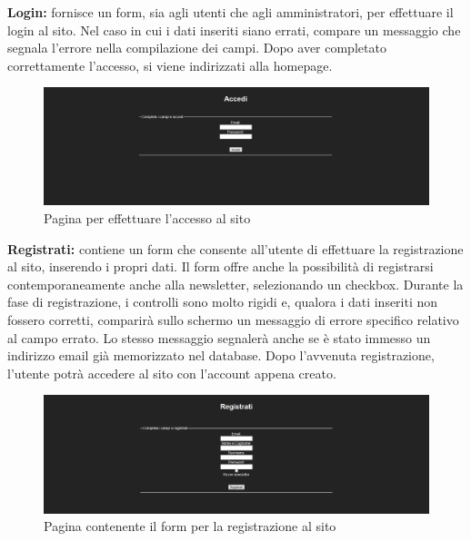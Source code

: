 \documentclass[10pt, a4paper]{article}
\begin{document}
\begin{flushleft} \textbf{Login: }fornisce un form, sia agli utenti che agli amministratori, per effettuare il login al sito. Nel caso in cui i dati inseriti siano errati, compare un messaggio che segnala l'errore nella compilazione dei campi. Dopo aver completato correttamente l'accesso, si viene indirizzati alla homepage. \end{flushleft}
\begin{figure}[h!]
 \centering
  \includegraphics[width=1\textwidth]{Images/login.png}
  \caption{Pagina per effettuare l'accesso al sito}
  \label{fig:login}
\end{figure}
\begin{flushleft} \textbf{Registrati: }contiene un form che consente all'utente di effettuare la registrazione al sito, inserendo i propri dati. Il form offre anche la possibilità di registrarsi contemporaneamente anche alla newsletter, selezionando un checkbox. Durante la fase di registrazione, i controlli sono molto rigidi e, qualora i dati inseriti non fossero corretti, comparirà sullo schermo un messaggio di errore specifico relativo al campo errato. Lo stesso messaggio segnalerà anche se è stato immesso un indirizzo email già memorizzato nel database. Dopo l'avvenuta registrazione, l'utente potrà accedere al sito con l'account appena creato. \end{flushleft}
\begin{figure}[h!]
 \centering
  \includegraphics[width=1\textwidth]{Images/registrazione.png}
  \caption{Pagina contenente il form per la registrazione al sito}
  \label{fig:registrazione}
\end{figure}
\end{document}
